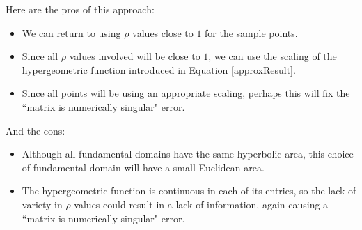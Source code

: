 \documentclass[]{article}
\begin{document}
Here are the pros of this approach:
\begin{itemize}
	\item We can return to using $\rho$ values close to $1$ for the sample points.
	\item Since all $\rho$ values involved will be close to $1$, we can use the scaling of the hypergeometric function introduced in Equation \ref{approxResult}.
	\item Since all points will be using an appropriate scaling, perhaps this will fix the ``matrix is numerically singular" error.
\end{itemize}
And the cons:
\begin{itemize}
	\item Although all fundamental domains have the same hyperbolic area, this choice of fundamental domain will have a small Euclidean area.
	\item The hypergeometric function is continuous in each of its entries, so the lack of variety in $\rho$ values could result in a lack of information, again causing a ``matrix is numerically singular" error.
\end{itemize}
	
\end{document}
